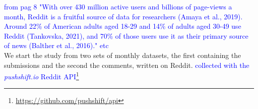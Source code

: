 \textcolor{blue}{from \cite{villanueva2021climate} pag 8 
"With over 430 million active users and billions of page-views a month, Reddit is a fruitful source of data for researchers (Amaya et al., 2019). Around 22\% of American adults aged 18-29 and 14\% of adults aged 30-49 use Reddit (Tankovska, 2021), and 70\% of those users use it as their primary source of news (Balther et al., 2016)." etc}\\


We start the study from two sets of monthly datasets, the first containing the submissions and the second the comments, written on Reddit. \textcolor{blue}{collected with the  \emph{pushshift.io} Reddit API\footnote{\url{https://github.com/pushshift/api}} \cite{baumgartner2020pushshift}}  


